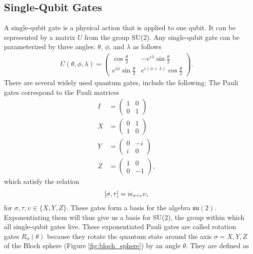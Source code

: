 \documentclass[Dual]{msu-thesis}
\begin{document}
\subsection{Single-Qubit Gates}

A single-qubit gate is a physical action that is applied to one qubit. It can be represented by a matrix $U$ from the group SU(2). Any single-qubit gate can be parameterized by three angles: $\theta$, $\phi$, and $\lambda$ as follows
\begin{align}
\label{U}
U(\theta,\phi,\lambda)
=
\begin{pmatrix}
\cos\frac{\theta}{2} & -e^{i\lambda}\sin\frac{\theta}{2}
\\
e^{i\phi}\sin\frac{\theta}{2} & e^{i(\phi+\lambda)}\cos\frac{\theta}{2}
\end{pmatrix}
.\end{align}
There are several widely used quantum gates, include the following:
The Pauli gates correspond to the Pauli matrices
\begin{align}
I
&=
\begin{pmatrix}
1 & 0 \\
0 & 1
\end{pmatrix}
\\
X
&=
\begin{pmatrix}
0 & 1 \\
1 & 0
\end{pmatrix}
\\
Y
&=
\begin{pmatrix}
0 & -i \\
i & 0
\end{pmatrix}
\\
Z
&=
\begin{pmatrix}
1 & 0 \\
0 & -1
\end{pmatrix}
,\end{align}
which satisfy the relation
\begin{align}
\comm{\sigma}{\tau}=i\epsilon_{\sigma\tau\upsilon}\upsilon
,\end{align}
for $\sigma,\tau,\upsilon\in\{X,Y,Z\}$. These gates form a basis for the algebra $\mathfrak{su}(2)$. Exponentiating them will thus give us a basis for SU(2), the group within which all single-qubit gates live. These exponentiated Pauli gates are called rotation gates $R_{\sigma}(\theta)$ because they rotate the quantum state around the axis $\sigma=X,Y,Z$ of the Bloch sphere (Figure \ref{fig:bloch_sphere}) by an angle $\theta$. They are defined as
\end{document}
